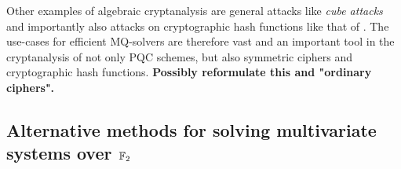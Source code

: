 Other examples of algebraic cryptanalysis are general attacks like \textit{cube attacks} \cite{Videau2011} and importantly also attacks on cryptographic hash functions like that of \cite{10.1007/978-3-642-21702-9_6}. The use-cases for efficient MQ-solvers are therefore vast and an important tool in the cryptanalysis of not only PQC schemes, but also  symmetric ciphers and cryptographic hash functions. \textbf{Possibly reformulate this and "ordinary ciphers".}

\subsection{Alternative methods for solving multivariate systems over $\mathbb{F}_2$}

\newpage
